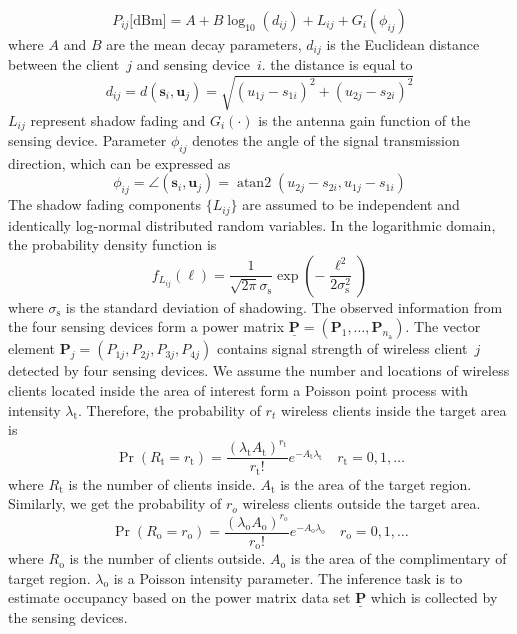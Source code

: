 \begin{equation} 
P_{ij} \text{[dBm]}
= A + B \log_{10}(d_{ij}) + L_{ij} + G_i (\phi_{ij})
\end{equation}
where $A$ and $B$ are the mean decay parameters, $d_{ij}$ is the Euclidean distance between the client~$j$ and sensing device~$i$.
the distance is equal to
\begin{equation*}
d_{ij} = d(\mathbf{s}_i, \mathbf{u}_j)= \sqrt{ (u_{1j} - s_{1i})^2 + (u_{2j} - s_{2i})^2 } 
\end{equation*}
$L_{ij}$ represent shadow fading and $G_i (\cdot)$ is the antenna gain function of the sensing device.
Parameter $\phi_{ij}$ denotes the angle of the signal transmission direction, which can be expressed as
\begin{equation*}
\phi_{ij} = \angle (\mathbf{s}_i, \mathbf{u}_j)
= \operatorname{atan2} ( u_{2j} - s_{2i}, u_{1j} - s_{1i} )
\end{equation*}
The shadow fading components $\{ L_{ij} \}$ are assumed to be independent and identically log-normal distributed random variables.
In the logarithmic domain, the probability density function is
\begin{equation} 
f_{L_{ij}} (\ell)
= \frac{1}{\sqrt{2 \pi} \sigma_{\mathrm{s}}} 
\exp \left( - \frac{\ell^2}{2 \sigma_{\mathrm{s}}^2} \right)
\end{equation}
where $\sigma_{\mathrm{s}}$ is the standard deviation of shadowing.
The observed information from the four sensing devices form a power matrix $\underline{\mathbf{P}} = (\mathbf{P}_1, \ldots, \mathbf{P}_{n_{\mathrm{a}}})$.
The vector element $\mathbf{P}_j = (P_{1j}, P_{2j},P_{3j},P_{4j})$ contains signal strength of wireless client~$j$ detected by four sensing devices.
We assume the number and locations of wireless clients located inside the area of interest form a Poisson point process with intensity $\lambda_{\mathrm{t}}$.
Therefore, the probability of $r_{t}$ wireless clients inside the target area is
\begin{equation*}
\Pr ( R_{\mathrm{t}} = r_{\mathrm{t}} )
= \frac{(\lambda_{\mathrm{t}} A_{\mathrm{t}})^{r_{\mathrm{t}}}}
{r_{\mathrm{t}}!} e^{- A_{\mathrm{t}} \lambda_{\mathrm{t}}}
\quad r_{\mathrm{t}} = 0, 1, \ldots
\end{equation*}
where $R_{\mathrm{t}}$ is the number of clients inside.
$A_{\mathrm{t}}$ is the area of the target region.
Similarly, we get the probability of $r_{o}$ wireless clients outside the target area.
\begin{equation*}
\Pr ( R_{\mathrm{o}} = r_{\mathrm{o}} )
= \frac{(\lambda_{\mathrm{o}} A_{\mathrm{o}})^{r_{\mathrm{o}}}}
{r_{\mathrm{o}}!} e^{- A_{\mathrm{o}} \lambda_{\mathrm{o}}}
\quad r_{\mathrm{o}} = 0, 1, \ldots
\end{equation*}
where $R_{\mathrm{o}}$ is the number of clients outside.
$A_{\mathrm{o}}$ is the area of the complimentary of target region.
$\lambda_{\mathrm{o}}$ is a Poisson intensity parameter.
The inference task is to estimate occupancy based on the power matrix data set $\underline{\mathbf{P}}$ which is collected by the sensing devices.

